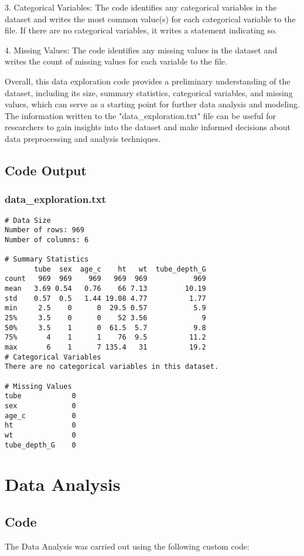 \documentclass[11pt]{article}
\begin{document}
3. Categorical Variables: The code identifies any categorical variables in the dataset and writes the most common 
   value(s) for each categorical variable to the file. If there are no categorical variables, it writes a statement 
   indicating so.

4. Missing Values: The code identifies any missing values in the dataset and writes the count of missing values for 
   each variable to the file.

Overall, this data exploration code provides a preliminary understanding of the dataset, including its size, 
summary statistics, categorical variables, and missing values, which can serve as a starting point for further 
data analysis and modeling. The information written to the "data\_exploration.txt" file can be useful for researchers 
to gain insights into the dataset and make informed decisions about data preprocessing and analysis techniques.

\subsection{Code Output}

\subsubsection*{data\_exploration.txt}

\begin{Verbatim}[tabsize=4]
# Data Size
Number of rows: 969
Number of columns: 6

# Summary Statistics
       tube  sex  age_c    ht   wt  tube_depth_G
count   969  969    969   969  969           969
mean   3.69 0.54   0.76    66 7.13         10.19
std    0.57  0.5   1.44 19.08 4.77          1.77
min     2.5    0      0  29.5 0.57           5.9
25%     3.5    0      0    52 3.56             9
50%     3.5    1      0  61.5  5.7           9.8
75%       4    1      1    76  9.5          11.2
max       6    1      7 135.4   31          19.2
# Categorical Variables
There are no categorical variables in this dataset.

# Missing Values
tube            0
sex             0
age_c           0
ht              0
wt              0
tube_depth_G    0
\end{Verbatim}

\section{Data Analysis}
\subsection{{Code}}
The Data Analysis was carried out using the following custom code:
\end{document}
